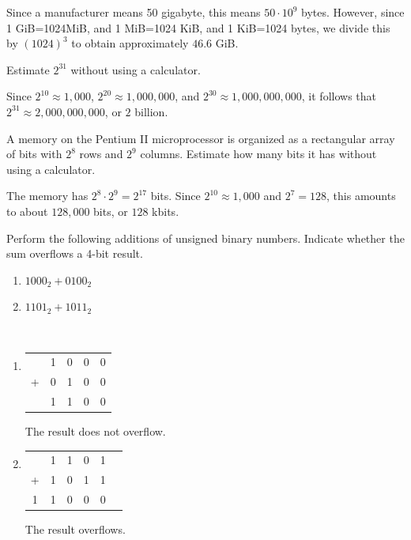 \documentclass[12pt]{article}
\newenvironment{ex}[2][Exercise]{\begin{trivlist}
		\item[\hskip \labelsep {\bfseries #1}\hskip \labelsep {\bfseries #2.}]}{\end{trivlist}}
\newenvironment{sol}[1][Solution]{\begin{trivlist}
		\item[\hskip \labelsep {\bfseries #1:}]}{\end{trivlist}}
\begin{document}
\begin{sol}
	Since a manufacturer means 50 gigabyte, this means $50\cdot 10^9$ bytes. However, since 1 GiB=1024MiB, and 1 MiB=1024 KiB, and 1 KiB=1024 bytes, we divide this by $(1024)^3$ to obtain approximately $46.6$ GiB.
\end{sol}

\begin{ex}{1.48}
	Estimate $2^{31}$ without using a calculator.
\end{ex}

\begin{sol}
	Since $2^{10}\approx 1,000$, $2^{20}\approx 1,000,000$, and $2^{30}\approx 1,000,000,000$, it follows that $2^{31}\approx 2,000,000,000$, or $2$ billion.
\end{sol}

\begin{ex}{1.49}
	A memory on the Pentium II microprocessor is organized as a rectangular array of bits with $2^8$ rows and $2^9$ columns. Estimate how many bits it has without using a calculator.
\end{ex}

\begin{sol}
	The memory has $2^{8}\cdot 2^{9}=2^{17}$ bits. Since $2^{10}\approx 1,000$ and $2^{7}=128$, this amounts to about $128,000$ bits, or $128$ kbits.
\end{sol}

\begin{ex}{1.52}
	Perform the following additions of unsigned binary numbers. Indicate whether the sum overflows a 4-bit result.
	\begin{enumerate}[label=(\alph*)]
		\item $1000_2+0100_2$
		\item $1101_2+1011_2$
	\end{enumerate}
\end{ex}

\begin{sol}\
	\begin{enumerate}[label=(\alph*)]
		\item
		\begin{center}
			\begin{tabular}{c@{\,}c@{\,}c@{\,}c@{\,}c@{\,}}
				& 1 & 0 & 0 & 0 \\
				+ & 0 & 1 & 0 & 0 \\
				\hline
				& 1 & 1 & 0 & 0
			\end{tabular}
		\end{center}
		The result does not overflow.
		\item
		\begin{center}
			\begin{tabular}{c*{5}{@{\,}c}}
				& 1 & 1 & 0 & 1 \\
				+ & 1 & 0 & 1 & 1 \\
				& 1& 0& 0& 0
			\end{tabular}
		\end{center}
		The result overflows.
	\end{enumerate}
\end{sol}
\end{document}

